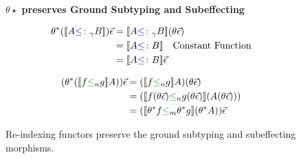     \begin{figure}
        \begin{framed}
            \centering\textbf{$\theta\star$ preserves Ground Subtyping and Subeffecting}
    
            \begin{minipage}{.45\linewidth}
                \begin{align*}
                    \theta\star(\deno{A\subtypeg B})\ev  & = \deno{A\subtypeg B}(\theta\ev)\\
                    & = \deno{A\subtype B} \qt{Constant Function}\\
                    & = \deno{A\subtype B} \ev\\
                \end{align*}
            \end{minipage}
            \quad
            \begin{minipage}{.45\linewidth}
                \begin{align*}
                    (\theta\star(\dsen{f}{g} A))\ev & = (\dsen{f}{g} A)(\theta \ev)\\
                    & = (\dsen{f(\theta\ev)}{g(\theta\ev)}(A(\theta\ev)))\\
                    & = (\dsem{\theta\star f}{\theta\star g} (\theta\star A)) \ev\\
                \end{align*}
            \end{minipage}
        \end{framed}
        \caption{Re-indexing functors preserve the ground subtyping and subeffecting morphisms.}
        \label{PreservesSubtypingSubeffecting}
    \end{figure}
